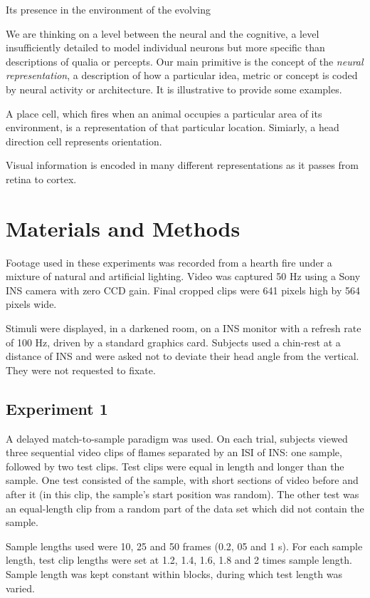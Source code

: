 \documentclass[a4paper]{article}
\begin{document}
Its presence in the environment of the evolving 


We are thinking on a level between the neural and the cognitive, a level insufficiently detailed to model individual neurons but more specific than descriptions of qualia or percepts. Our main primitive is the concept of the \textit{neural representation}, a description of how a particular idea, metric or concept is coded by neural activity or architecture. It is illustrative to provide some examples.


A place cell, which fires when an animal occupies a particular area of its environment, is a representation of that particular location. Simiarly, a head direction cell represents orientation.

Visual information is encoded in many different representations as it passes from retina to cortex.


\section{Materials and Methods}

Footage used in these experiments was recorded from a hearth fire under a mixture of natural and artificial lighting. Video was captured 50 Hz using a Sony INS camera with zero CCD gain. Final cropped clips were 641 pixels high by 564 pixels wide.

Stimuli were displayed, in a darkened room, on a INS monitor with a refresh rate of 100 Hz, driven by a standard graphics card. Subjects used a chin-rest at a distance of INS and were asked not to deviate their head angle from the vertical. They were not requested to fixate.

\subsection{Experiment 1}

A delayed match-to-sample paradigm was used. On each trial, subjects viewed three sequential video clips of flames separated by an ISI of INS: one sample, followed by two test clips. Test clips were equal in length and longer than the sample. One test consisted of the sample, with short sections of video before and after it (in this clip, the sample's start position was random). The other test was an equal-length clip from a random part of the data set which did not contain the sample.

Sample lengths used were 10, 25 and 50 frames (0.2, 05 and 1 s). For each sample length, test clip lengths were set at 1.2, 1.4, 1.6, 1.8 and 2 times sample length. Sample length was kept constant within blocks, during which test length was varied.
\end{document}
